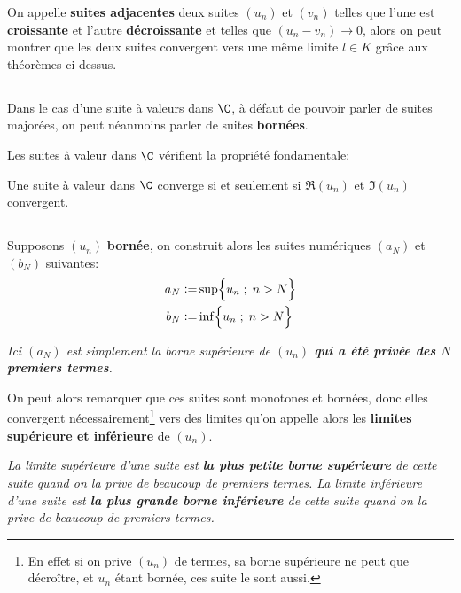 On appelle \textbf{suites adjacentes} deux suites \((u_n)\) et \((v_n)\) telles que l'une est \textbf{croissante} et l'autre \textbf{décroissante} et telles que \((u_n - v_n) \rightarrow 0\), alors on peut montrer que les deux suites convergent vers une même limite \(l \in K\) grâce aux théorèmes ci-dessus.

\subsection*{}
Dans le cas d'une suite à valeurs dans \(\C\), à défaut de pouvoir parler de suites majorées, on peut néanmoins parler de suites \textbf{bornées}.\<

Les suites à valeur dans \(\C\) vérifient la propriété fondamentale:

Une suite à valeur dans \(\C\) converge si et seulement si \(\Re(u_n)\) et \(\Im(u_n)\) convergent.

\subsection*{}
Supposons \((u_n)\) \textbf{bornée}, on construit alors les suites numériques \((a_N)\) et \((b_N)\) suivantes:
\begin{align*}
    a_N := &\sup\Bigl\{ u_n \; ; \; n > N \Bigl\} \\
    b_N := &\inf\Bigl\{ u_n \; ; \; n > N \Bigl\}
\end{align*}
\begin{center}
    \textit{
        Ici \((a_N)\) est simplement la borne supérieure de \((u_n)\) \textbf{qui a été privée des \(N\) premiers termes}.
    }
\end{center}
On peut alors remarquer que ces suites sont monotones et bornées, donc elles convergent nécessairement\footnote[1]{En effet si on prive \((u_n)\) de termes, sa borne supérieure ne peut que décroître, et \(u_n\) étant bornée, ces suite le sont aussi.} vers des limites qu'on appelle alors les \textbf{limites supérieure et inférieure} de \((u_n)\).

\begin{center}
    \textit{
        La limite supérieure d'une suite est \textbf{la plus petite borne supérieure} de cette suite quand on la prive de beaucoup de premiers termes.\+
        La limite inférieure d'une suite est \textbf{la plus grande borne inférieure} de cette suite quand on la prive de beaucoup de premiers termes.\+
    }
\end{center}

